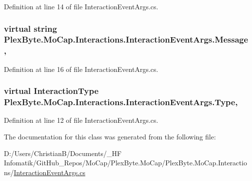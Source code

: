 Definition at line 14 of file Interaction\+Event\+Args.\+cs.

\subsubsection[{\texorpdfstring{Message}{Message}}]{\setlength{\rightskip}{0pt plus 5cm}virtual string Plex\+Byte.\+Mo\+Cap.\+Interactions.\+Interaction\+Event\+Args.\+Message\hspace{0.3cm}{\ttfamily [get]}, {\ttfamily [set]}}\hypertarget{class_plex_byte_1_1_mo_cap_1_1_interactions_1_1_interaction_event_args_a92bca66520070fac40f3b94a42ae0966}{}\label{class_plex_byte_1_1_mo_cap_1_1_interactions_1_1_interaction_event_args_a92bca66520070fac40f3b94a42ae0966}


Definition at line 16 of file Interaction\+Event\+Args.\+cs.

\subsubsection[{\texorpdfstring{Type}{Type}}]{\setlength{\rightskip}{0pt plus 5cm}virtual {\bf Interaction\+Type} Plex\+Byte.\+Mo\+Cap.\+Interactions.\+Interaction\+Event\+Args.\+Type\hspace{0.3cm}{\ttfamily [get]}, {\ttfamily [set]}}\hypertarget{class_plex_byte_1_1_mo_cap_1_1_interactions_1_1_interaction_event_args_a0783f16c0e4140f16a9448f63ff28f5b}{}\label{class_plex_byte_1_1_mo_cap_1_1_interactions_1_1_interaction_event_args_a0783f16c0e4140f16a9448f63ff28f5b}


Definition at line 12 of file Interaction\+Event\+Args.\+cs.



The documentation for this class was generated from the following file\+:\begin{DoxyCompactItemize}
\item 
D\+:/\+Users/\+Christian\+B/\+Documents/\+\_\+\+H\+F Infomatik/\+Git\+Hub\+\_\+\+Repos/\+Mo\+Cap/\+Plex\+Byte.\+Mo\+Cap/\+Plex\+Byte.\+Mo\+Cap.\+Interactions/\hyperlink{_interaction_event_args_8cs}{Interaction\+Event\+Args.\+cs}\end{DoxyCompactItemize}
